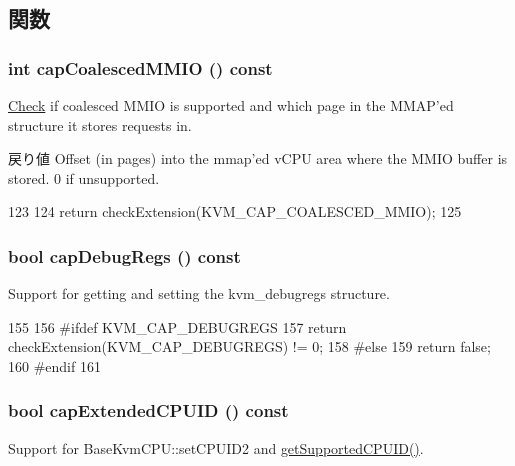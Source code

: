 \subsection{関数}
\hypertarget{classKvm_a23013f2d078b52428edae7ecfb6b5b7b}{
\subsubsection[{capCoalescedMMIO}]{\setlength{\rightskip}{0pt plus 5cm}int capCoalescedMMIO () const}}
\label{classKvm_a23013f2d078b52428edae7ecfb6b5b7b}
\hyperlink{classCheck}{Check} if coalesced MMIO is supported and which page in the MMAP'ed structure it stores requests in.

\begin{DoxyReturn}{戻り値}
Offset (in pages) into the mmap'ed vCPU area where the MMIO buffer is stored. 0 if unsupported. 
\end{DoxyReturn}



\begin{DoxyCode}
123 {
124     return checkExtension(KVM_CAP_COALESCED_MMIO);
125 }
\end{DoxyCode}
\hypertarget{classKvm_a4e15b92a17300f1d37ceca6e4a984086}{
\subsubsection[{capDebugRegs}]{\setlength{\rightskip}{0pt plus 5cm}bool capDebugRegs () const}}
\label{classKvm_a4e15b92a17300f1d37ceca6e4a984086}
Support for getting and setting the kvm\_\-debugregs structure. 


\begin{DoxyCode}
155 {
156 #ifdef KVM_CAP_DEBUGREGS
157     return checkExtension(KVM_CAP_DEBUGREGS) != 0;
158 #else
159     return false;
160 #endif
161 }
\end{DoxyCode}
\hypertarget{classKvm_a6db5aefbe1a9535f5124ef07a04e23a5}{
\subsubsection[{capExtendedCPUID}]{\setlength{\rightskip}{0pt plus 5cm}bool capExtendedCPUID () const}}
\label{classKvm_a6db5aefbe1a9535f5124ef07a04e23a5}
Support for BaseKvmCPU::setCPUID2 and \hyperlink{classKvm_a74bec0050eeeffd21d5f85cb929c802b}{getSupportedCPUID()}. 


